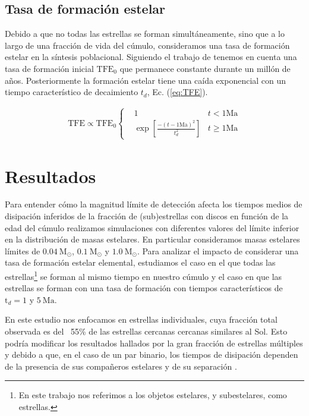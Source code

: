 \documentclass[baaa]{baaa}
\begin{document}
\subsection{Tasa de formación estelar}



Debido a que no todas las estrellas se forman simult\'aneamente, sino que a lo largo de una fracci\'on de vida del c\'umulo, consideramos una tasa de formación estelar en la s\'intesis poblacional. Siguiendo el trabajo de \cite{coleman2022dispersal} tenemos en cuenta una tasa de formación inicial $\mathrm{TFE}_{0}$ que permanece constante durante un millón de años. Posteriormente la formación estelar tiene una caída exponencial con un tiempo característico de decaimiento $t_{d}$, Ec. (\ref{eq:TFE}). 

\begin{align}

    \mathrm{TFE} \propto \mathrm{TFE}_{0}  \left \{
      \begin{array}{rcl}
          & 1 & t <  \mathrm{1 Ma} \\ 
         & \exp \left[ \frac{-(t- \mathrm{1 Ma})^{2}}{t^{2}_{d}} \right] & t \geq \mathrm{1 Ma}
      \end{array}
   \right .
    \label{eq:TFE}
\end{align}

\section{Resultados}

Para entender cómo la magnitud límite de detección afecta los tiempos medios de disipación inferidos de la fracción de (sub)estrellas con discos en función de la edad del cúmulo realizamos simulaciones con diferentes valores del límite inferior en la distribución de masas estelares. En particular consideramos masas estelares límites de $0.04~\mathrm{M}_{\odot}$, $0.1~\mathrm{M}_{\odot}$ y $1.0~\mathrm{M}_{\odot}$. Para analizar el impacto de considerar una tasa de formación estelar elemental, estudiamos el caso en el que todas las estrellas\footnote{En este trabajo nos referimos a los objetos estelares, y subestelares, como estrellas.} se forman al mismo tiempo en nuestro c\'umulo y el caso en que las estrellas se forman con una tasa de formación con tiempos característicos de $\mathrm{t}_{d} =1$ y $5~\mathrm{Ma}$. 

En este estudio nos enfocamos en estrellas individuales, cuya fracción total observada es del ~55\% \citep{Raghavan_2010} de las estrellas cercanas cercanas similares al Sol. Esto podría modificar los resultados hallados por la gran fracción de estrellas múltiples y debido a que, en el caso de un par binario, los tiempos de disipación dependen de la presencia de sus compañeros estelares y de su separación \cite{2012Krous}.
\end{document}
